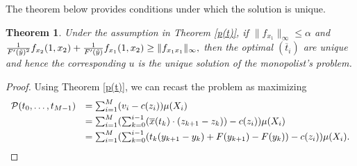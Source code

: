 \documentclass[12pt,reqno]{amsart}
\newtheorem{theorem}{Theorem}
\begin{document}
The theorem below provides conditions under which the solution is unique. 
\begin{theorem}\label{thm: uniqueness}
Under the assumption in Theorem \ref{p(t)}, if $\|f_{x_1}\|_\infty\le\alpha$ and $\frac{1}{F'(\Tilde{y})^2} f_{x_2}(1,x_2)+\frac{1}{F'(\Tilde{y})}f_{x_1}(1,x_2)\ge\|f_{x_1x_1}\|_\infty,$  then the optimal $(\overline{t}_i)$ are unique and hence the corresponding $u$ is the unique solution of the monopolist's problem.
\end{theorem}
\begin{proof}
Using Theorem \ref{p(t)}, we can recast the problem as maximizing \[\begin{array}{ll}
 \mathcal{P}(t_0,\dots,t_{M-1})&=\sum_{i=1}^M(v_i-c(z_i))\mu( X_i)\vspace{3pt}\\
 &=\sum_{i=1}^M(\sum_{k=0}^{i-1}(\overline{x}(t_{k})\cdot (z_{k+1}-z_{k}))-c(z_i))\mu( X_i)\vspace{3pt}\\
 &=\sum_{i=1}^M(\sum_{k=0}^{i-1}(t_{k} (y_{k+1}-y_{k})+F(y_{k+1})-F(y_{k}))-c(z_i))\mu( X_i).
 \end{array}\] 


\end{proof}
\end{document}
